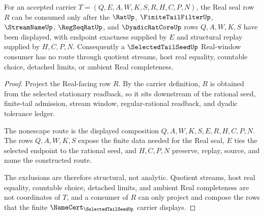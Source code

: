 \begin{theorem}
\label{thm:selected-tail-seed-real-seal-nonescape-obligation}
For an accepted carrier $T=(Q,E,A,W,K,S,R,H,C,P,N)$, the Real seal row $R$ can be consumed only after the $\RatUp$, $\FiniteTailFilterUp$, $\StreamNameUp$, $\RegSeqRatUp$, and $\DyadicRatCoreUp$ rows $Q,A,W,K,S$ have been displayed, with endpoint exactness supplied by $E$ and structural replay supplied by $H,C,P,N$. Consequently a $\SelectedTailSeedUp$ Real-window consumer has no route through quotient streams, host real equality, countable choice, detached limits, or ambient Real completeness.
\end{theorem}
\begin{proof}
Project the Real-facing row $R$. By the carrier definition, $R$ is obtained from the selected stationary readback, so it sits downstream of the rational seed, finite-tail admission, stream window, regular-rational readback, and dyadic tolerance ledger.

The nonescape route is the displayed composition $Q,A,W,K,S,E,R,H,C,P,N$. The rows $Q,A,W,K,S$ expose the finite data needed for the Real seal, $E$ ties the selected endpoint to the rational seed, and $H,C,P,N$ preserve, replay, source, and name the constructed route.

The exclusions are therefore structural, not analytic. Quotient streams, host real equality, countable choice, detached limits, and ambient Real completeness are not coordinates of $T$, and a consumer of $R$ can only project and compose the rows that the finite $\NameCert_{\SelectedTailSeedUp}$ carrier displays.
\end{proof}

